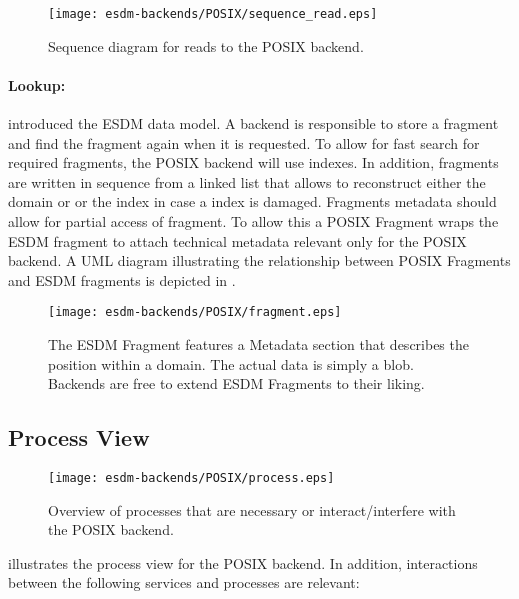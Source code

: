 \begin{figure}
	\centering
	\texttt{[image: esdm-backends/POSIX/sequence\_read.eps]}
	\caption{Sequence diagram for reads to the POSIX backend.}
	\label{fig:backend posix sequence read}
\end{figure}



\paragraph{Lookup:}

 introduced the ESDM data model.
A backend is responsible to store a fragment and find the fragment again when it is requested.
To allow for fast search for required fragments, the POSIX backend will use indexes.
In addition, fragments are written in sequence from a linked list that allows to reconstruct either the domain or or the index in case a index is damaged.
Fragments metadata should allow for partial access of fragment.
To allow this a POSIX Fragment wraps the ESDM fragment to attach technical metadata relevant only for the POSIX backend.
A UML diagram illustrating the relationship between POSIX Fragments and ESDM fragments is depicted in .

\begin{figure}
	\centering
	\texttt{[image: esdm-backends/POSIX/fragment.eps]}
	\caption{The ESDM Fragment features a Metadata section that describes the position within a domain. The actual data is simply a blob. Backends are free to extend ESDM Fragments to their liking.}
	\label{fig:backend posix fragment}
\end{figure}





\subsection{Process View}
\label{backend: posix/process}

\begin{figure}
	\centering
	\texttt{[image: esdm-backends/POSIX/process.eps]}
	\caption{Overview of processes that are necessary or interact/interfere with the POSIX backend.}
	\label{fig:backend posix process view}
\end{figure}

 illustrates the process view for the POSIX backend. In addition, interactions between the following services and processes are relevant:


